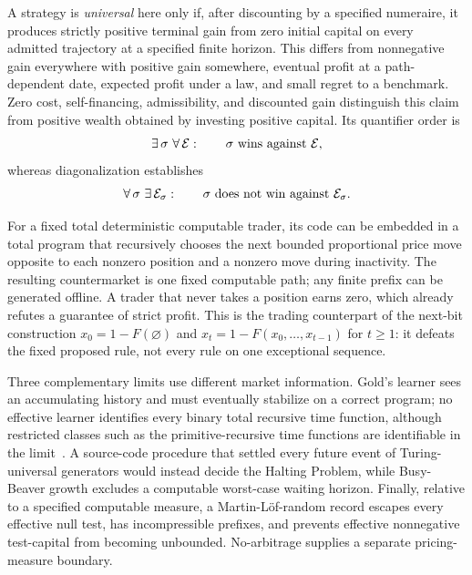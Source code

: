 \documentclass[aps,pra,reprint,superscriptaddress,amsmath,amssymb,floatfix]{revtex4-2}
\theoremstyle{plain}
\theoremstyle{definition}
\theoremstyle{remark}
\begin{document}
A strategy is \emph{universal} here only if, after discounting by a specified
numeraire, it produces strictly positive terminal gain from zero initial
capital on every admitted trajectory at a specified finite horizon. This
differs from nonnegative gain everywhere with positive gain somewhere, eventual
profit at a path-dependent date, expected profit under a law, and small regret
to a benchmark. Zero cost, self-financing,
admissibility, and discounted gain distinguish this claim from positive wealth
obtained by investing positive capital. Its quantifier order is
\begin{equation}
  \exists\,\sigma\ \forall\,\mathcal E:
  \qquad \sigma\ \hbox{wins against }\mathcal E,
  \label{eq:universalquantifiers}
\end{equation}
whereas diagonalization establishes
\begin{equation}
  \forall\,\sigma\ \exists\,\mathcal E_\sigma:
  \qquad \sigma\ \hbox{does not win against }\mathcal E_\sigma.
  \label{eq:counterquantifiers}
\end{equation}

For a fixed total deterministic computable trader, its code can be embedded in
a total program that recursively chooses the next bounded proportional price
move opposite to each nonzero position and a nonzero move during inactivity.
The resulting countermarket is one
fixed computable path; any finite prefix can be generated offline. A trader that
never takes a position earns zero, which already refutes a guarantee of strict
profit. This is the trading counterpart of the next-bit construction
\(x_0=1-F(\varnothing)\) and
\(x_t=1-F(x_0,\ldots,x_{t-1})\) for \(t\geq1\): it defeats the fixed proposed
rule, not every rule on one exceptional sequence.

Three complementary limits use different market information. Gold's learner
sees an accumulating history and must eventually stabilize on a correct
program; no effective learner identifies every binary total recursive time
function, although restricted classes such as the primitive-recursive time
functions are identifiable in the limit~\cite{go-65,go-67}. A source-code
procedure that settled every future event of Turing-universal generators would
instead decide the Halting Problem, while Busy-Beaver growth excludes a
computable worst-case waiting horizon. Finally, relative to a specified
computable measure, a Martin-L\"of-random record escapes every effective null
test, has incompressible prefixes, and prevents effective nonnegative
test-capital from becoming unbounded. No-arbitrage supplies a separate
pricing-measure boundary.
\end{document}

